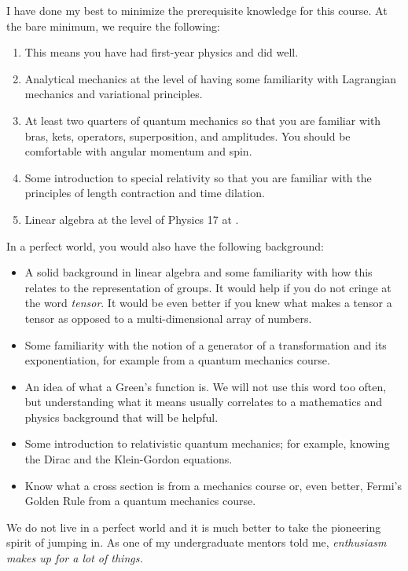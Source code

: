 \documentclass[12pt, oneside]{report}    %
\begin{document}
I have done my best to minimize the prerequisite knowledge for this course. At the bare minimum, we require the following:
\begin{enumerate}
    \item This means you have had first-year physics and did well.
    \item Analytical mechanics at the level of having some familiarity with Lagrangian mechanics and variational principles.
    \item At least two quarters of quantum mechanics so that you are familiar with bras, kets, operators, superposition, and amplitudes. You should be comfortable with angular momentum and spin.
    \item Some introduction to special relativity so that you are familiar with the principles of length contraction and time dilation.
    \item Linear algebra at the level of Physics 17 at .
\end{enumerate}

In a perfect world, you would also have the following background:
\begin{itemize}
    \item A solid background in linear algebra and some familiarity with how this relates to the representation of groups. It would help if you do not cringe at the word \emph{tensor}. It would be even better if you knew what makes a tensor a tensor as opposed to a multi-dimensional array of numbers.
    \item Some familiarity with the notion of a generator of a transformation and its exponentiation, for example from a quantum mechanics course.
    \item An idea of what a Green's function is. We will not use this word too often, but understanding what it means usually correlates to a mathematics and physics background that will be helpful.
    \item Some introduction to relativistic quantum mechanics; for example, knowing the Dirac and the Klein-Gordon equations.
    \item Know what a cross section is from a mechanics course or, even better, Fermi's Golden Rule from a quantum mechanics course.
\end{itemize}
We do not live in a perfect world and it is much better to take the pioneering spirit of jumping in. As one of my undergraduate mentors told me, \emph{enthusiasm makes up for a lot of things.}
\end{document}
